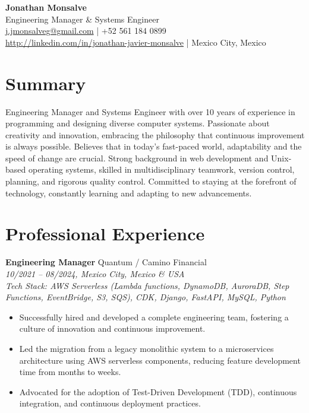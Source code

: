 \documentclass[a4paper,10pt]{article}
\begin{document}
\begin{center}
    \textbf{\LARGE Jonathan Monsalve} \\[0.5em]
    Engineering Manager \& Systems Engineer \\
    \href{mailto:j.jmonsalveg@gmail.com}{j.jmonsalveg@gmail.com} \hspace{1em} | \hspace{1em} +52 561 184 0899 \\
    \url{http://linkedin.com/in/jonathan-javier-monsalve} \hspace{1em} | \hspace{1em} Mexico City, Mexico
\end{center}

\vspace{1em}

\section*{Summary}
Engineering Manager and Systems Engineer with over 10 years of experience in programming and designing diverse computer systems. Passionate about creativity and innovation, embracing the philosophy that continuous improvement is always possible. Believes that in today's fast-paced world, adaptability and the speed of change are crucial. Strong background in web development and Unix-based operating systems, skilled in multidisciplinary teamwork, version control, planning, and rigorous quality control. Committed to staying at the forefront of technology, constantly learning and adapting to new advancements.

\section*{Professional Experience}

\textbf{Engineering Manager} \hfill Quantum / Camino Financial \\
\textit{10/2021 -- 08/2024, Mexico City, Mexico \& USA} \\
\textit{Tech Stack: AWS Serverless (Lambda functions, DynamoDB, AuroraDB, Step Functions, EventBridge, S3, SQS), CDK, Django, FastAPI, MySQL, Python} \\
\begin{itemize}[leftmargin=0.5cm]
    \item Successfully hired and developed a complete engineering team, fostering a culture of innovation and continuous improvement.
    \item Led the migration from a legacy monolithic system to a microservices architecture using AWS serverless components, reducing feature development time from months to weeks.
    \item Advocated for the adoption of Test-Driven Development (TDD), continuous integration, and continuous deployment practices.
\end{itemize}
\end{document}
